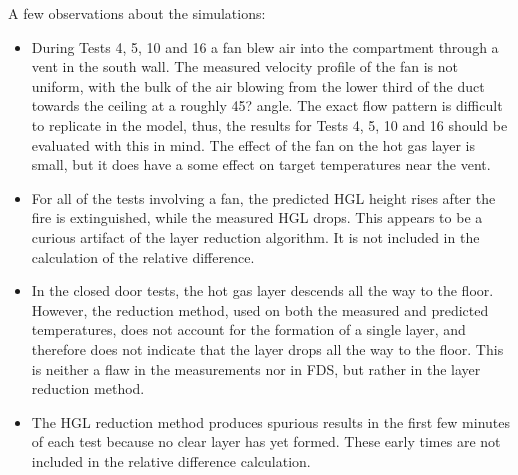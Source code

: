 A few observations about the simulations:
\begin{itemize}
\item During Tests 4, 5, 10 and 16 a fan blew air into the compartment through a vent in the south wall.
The measured velocity profile of the fan is not uniform, with the bulk of the air blowing from the lower third of the duct towards the ceiling at a
roughly 45? angle.  The exact flow pattern is difficult to replicate in the model, thus, the results for Tests 4, 5, 10 and 16 should be evaluated
with this in mind. The effect of the fan on the hot gas layer is small, but it does have a some effect on target temperatures near the vent.
\item For all of the tests involving a fan, the predicted HGL height rises after the fire is extinguished,
while the measured HGL drops.  This appears to be a curious artifact of the layer reduction algorithm. It is not included in the calculation of the
relative difference.
\item In the closed door tests, the hot gas layer descends all the way to the floor.
However, the reduction method, used on both the measured and predicted temperatures, does not account for the formation of a single layer, and
therefore does not indicate that the layer drops all the way to the floor. This is neither a flaw in the measurements nor in FDS, but rather in the
layer reduction method.
\item The HGL reduction method produces spurious results in the first few minutes of each test because no clear layer has yet formed.
These early times are not included in the relative difference calculation.
\end{itemize}

